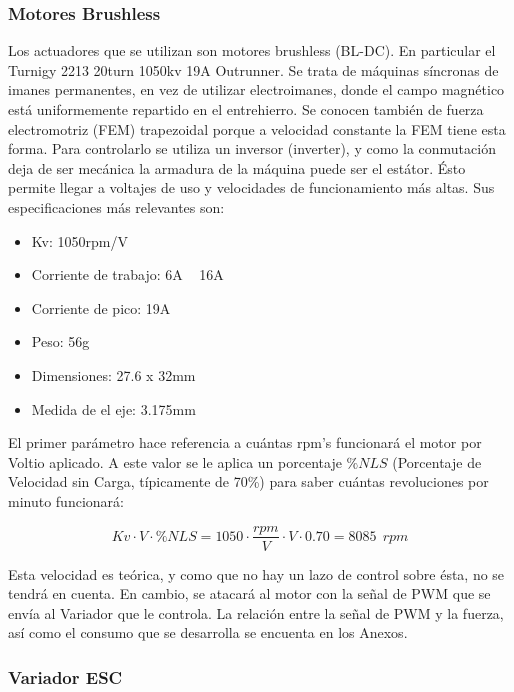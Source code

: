 \documentclass[twoside,11pt]{report}
\begin{document}
\subsubsection*{Motores Brushless}
Los actuadores que se utilizan son motores brushless (BL-DC). En particular el Turnigy 2213 20turn 1050kv 19A Outrunner.
Se trata de máquinas síncronas de imanes permanentes, en vez de utilizar electroimanes, donde el campo magnético está uniformemente repartido  en el entrehierro. Se conocen también de fuerza electromotriz (FEM) trapezoidal porque a velocidad constante la FEM tiene esta forma. 
Para controlarlo se utiliza un inversor (inverter), y como la conmutación deja de ser mecánica la armadura de la máquina puede ser el estátor. Ésto permite llegar a voltajes de uso y velocidades de funcionamiento más altas.
Sus especificaciones más relevantes son:
\begin{itemize}
\item Kv: 1050rpm/V
\item Corriente de trabajo: 6A ~ 16A
\item Corriente de pico: 19A
\item Peso: 56g
\item Dimensiones: 27.6 x 32mm
\item Medida de el eje: 3.175mm
\end{itemize}

El primer parámetro hace referencia a cuántas rpm's funcionará el motor por Voltio aplicado. A este valor se le aplica un porcentaje $\%NLS$ (Porcentaje de Velocidad sin Carga, típicamente de 70\%) para saber cuántas revoluciones por minuto funcionará:

\begin{equation}
Kv  \cdot V \cdot \%NLS = 1050 \cdot \frac{rpm}{V}\cdot V \cdot 0.70 = 8085 \>\> rpm
\end{equation}

Esta velocidad es teórica, y como que no hay un lazo de control sobre ésta, no se tendrá en cuenta. En cambio, se atacará al motor con la señal de PWM que se envía al Variador que le controla. La relación entre la señal de PWM y la fuerza, así como el consumo que se desarrolla se encuenta en los Anexos. 

\subsubsection*{Variador ESC}
\end{document}
